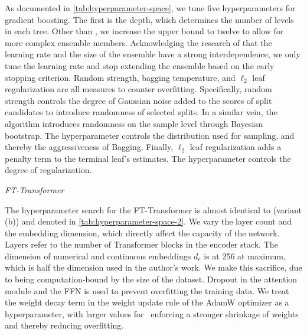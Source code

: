 As documented in \cref{tab:hyperparameter-space}, we tune five hyperparameters for gradient boosting. The first is the depth, which determines the number of levels in each tree. Other than \textcite[][]{gorishniyRevisitingDeepLearning2021}, we increase the upper bound to twelve to allow for more complex ensemble members. Acknowledging the research of \textcite[][14]{friedmanGreedyFunctionApproximation2001} that the learning rate \eta and the size of the ensemble have a strong interdependence, we only tune the learning rate and stop extending the ensemble based on the early stopping criterion. Random strength, bagging temperature, and $\ell_2$ leaf regularization are all measures to counter overfitting. Specifically, random strength controls the degree of Gaussian noise added to the scores of split candidates to introduce randomness of selected splits. In a similar vein, the algorithm introduces randomness on the sample level through Bayesian bootstrap. The hyperparameter controls the distribution used for sampling, and thereby the aggressiveness of Bagging. Finally, $\ell_2$ leaf regularization adds a penalty term to the terminal leaf's estimates. The hyperparameter controls the degree of regularization.

\emph{FT-Transformer}

The hyperparameter search for the FT-Transformer is almost identical to \textcite[][18]{gorishniyRevisitingDeepLearning2021} (variant (b)) and denoted in \cref{tab:hyperparameter-space-2}. We vary the layer count and the embedding dimension, which directly affect the capacity of the network. Layers refer to the number of Transformer blocks in the encoder stack. The dimension of numerical and continuous embeddings $d_e$ is at \num{256} at maximum, which is half the dimension used in the author's work. We make this sacrifice, due to being computation-bound by the size of the dataset. Dropout \autocite[][1930]{srivastavaDropoutSimpleWay} in the attention module and the \gls{FFN} is used to prevent overfitting the training data. We treat the weight decay term in the weight update rule of the AdamW optimizer as a hyperparameter, with larger values for \lambda~enforcing a stronger shrinkage of weights and thereby reducing overfitting.

